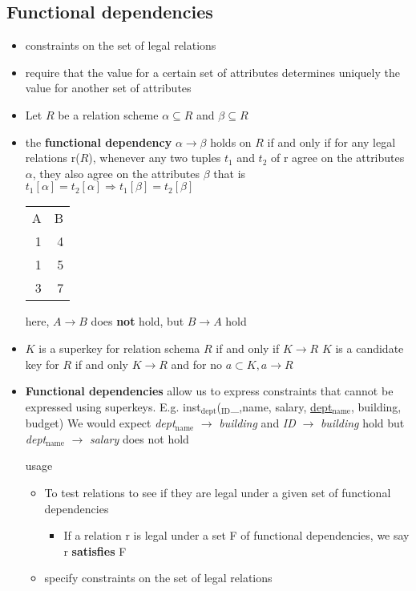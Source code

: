 \documentclass[11pt]{article}
\begin{document}
\subsection{Functional dependencies}
\label{sec-13-2}
\begin{itemize}
\item constraints on the set of legal relations
\item require that the value for a certain set of attributes determines uniquely
the value for another set of attributes
\item Let $R$ be a relation scheme
$\alpha\subseteq R$ and $\beta\subseteq R$
\item the \textbf{functional dependency}
$\alpha\to\beta$
holds on $R$ if and only if for any legal relations r($R$), whenever any
two tuples $t_1$ and $t_2$ of r agree on the attributes $\alpha$, they also
agree on the attributes $\beta$ that is
$t_1[\alpha]=t_2[\alpha]\Rightarrow t_1[\beta]=t_2[\beta]$
\begin{center}
\begin{tabular}{rr}
A & B\\
1 & 4\\
1 & 5\\
3 & 7\\
\end{tabular}
\end{center}
here, $A\to B$ does \textbf{not} hold, but $B\to A$ hold
\item $K$ is a superkey for relation schema $R$ if and only if $K\to R$
$K$ is a candidate key for $R$ if and only
$K\to R$ and for no $a\subset K, a\to R$
\item \textbf{Functional dependencies} allow us to express constraints that cannot be expressed
using superkeys. E.g.
inst$_{\text{dept}}$($_{\text{ID}}$\_,name, salary, \uline{dept$_{\text{name}}$}, building, budget)
We would expect \emph{dept$_{\text{name}}$} $\to$ \emph{building} and \emph{ID} $\to$ \emph{building} hold
but \emph{dept$_{\text{name}}$} $\to$ \emph{salary} does not hold
\item[{usage}] \begin{itemize}
\item To test relations to see if they are legal under a given set of functional dependencies
\begin{itemize}
\item If a relation r is legal under a set F of functional dependencies, we say r
\textbf{satisfies} F
\end{itemize}
\item specify constraints on the set of legal relations

\end{itemize}
\end{itemize}
\end{document}
